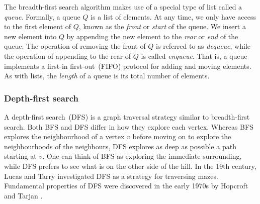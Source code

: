 
The breadth-first search algorithm makes use of a special type of list called a \emph{queue}. 
Formally, a queue $Q$ is a list of elements. 
At any time, we only have access to the first element of $Q$, known as the \emph{front} or \emph{start} of the queue. We insert
a new element into $Q$ by appending the new element to the \emph{rear} or \emph{end} of the queue. 
The operation of removing the front of $Q$ is referred to as \emph{dequeue}, while the operation of appending to the rear of $Q$ is called \emph{enqueue}. 
That is, a queue implements a first-in first-out~(FIFO) protocol for adding and moving elements. 
As with lists, the \emph{length} of a queue is its total number of elements.

\subsubsection{Depth-first search}


A depth-first search~(DFS) is a graph traversal strategy similar to
breadth-first search. Both BFS and DFS differ in how they explore each
vertex. Whereas BFS explores the neighbourhood of a vertex $v$ before
moving on to explore the neighbourhoods of the neighbours, DFS explores
as deep as possible a path starting at $v$. One can think of BFS as
exploring the immediate surrounding, while DFS prefers to see what is
on the other side of the hill. In the 19th century,
Lucas and Tarry investigated DFS as a strategy for traversing mazes. 
Fundamental properties of DFS were discovered in the early 1970s by Hopcroft and Tarjan \cite{schrijver2012history}.


